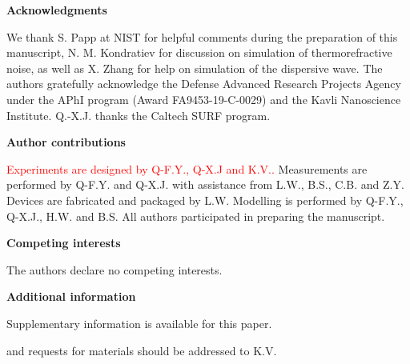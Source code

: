\documentclass[noshowpacs,amsmath,
twocolumn,
superscriptaddress,
8pt,
aps,prb]{revtex4-2}
\begin{document}
\noindent\textbf{Acknowledgments}

\begin{footnotesize}
\noindent We thank S. Papp at NIST for helpful comments during the preparation of this manuscript, N. M. Kondratiev for discussion on simulation of thermorefractive noise, as well as X. Zhang for help on simulation of the dispersive wave. The authors gratefully acknowledge the Defense Advanced Research Projects Agency under the APhI program (Award FA9453-19-C-0029) and the Kavli Nanoscience Institute. Q.-X.J. thanks the Caltech SURF program.
\end{footnotesize}

\medskip

\noindent\textbf{Author contributions} 

\begin{footnotesize}
\noindent \textcolor{red}{Experiments are designed by Q-F.Y., Q-X.J and K.V..} Measurements are performed by Q-F.Y. and Q-X.J. with assistance from L.W., B.S., C.B. and Z.Y. Devices are fabricated and packaged by L.W. Modelling is performed by Q-F.Y., Q-X.J., H.W. and B.S. All authors participated in preparing the manuscript.
\end{footnotesize}

\medskip

\noindent\textbf{Competing interests}

\begin{footnotesize}
\noindent The authors declare no competing interests.
\end{footnotesize}

\medskip

\noindent\textbf{Additional information}

\begin{footnotesize}
\noindent Supplementary information is available for this paper.

\medskip

 and requests for materials should be addressed to K.V.
\end{footnotesize}

\newpage
\end{document}
